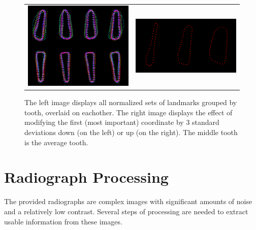\documentclass[a4paper,10pt]{article}
\begin{document}
\begin{figure}[h]

\begin{tabular}{cc}
\includegraphics[width=80mm]{landmarks.png} & \includegraphics[width=80mm]{modelvar-0-0.png}\\
 
\end{tabular}
 \caption{The left image displays all normalized sets of landmarks grouped by tooth, overlaid on eachother. The right image displays the effect of modifying the first (most important) coordinate by 3 standard deviations down (on the left) or up (on the right). The middle tooth is the average tooth.}
\end{figure}

\newpage
\section{Radiograph Processing}
The provided radiographs are complex images with significant amounts of noise and a relatively low contrast. Several steps of processing are needed to extract usable information from these images. \\
\end{document}
